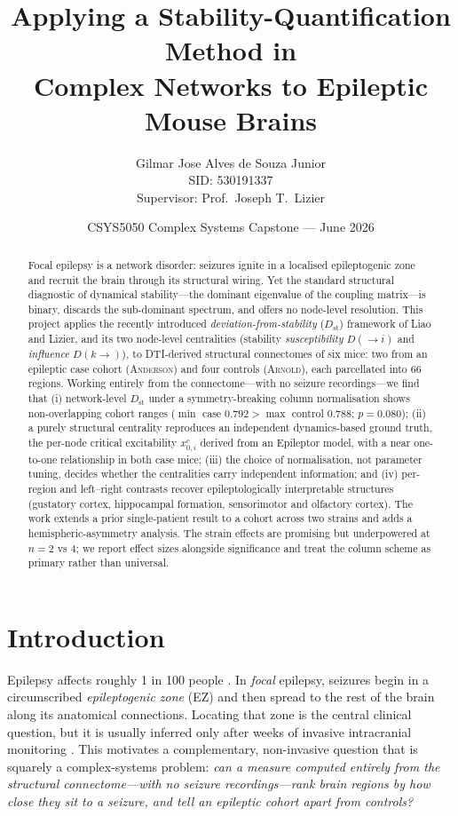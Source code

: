 \documentclass[11pt,a4paper]{article}
\title{\vspace{-1.5em}\textbf{Applying a Stability-Quantification Method in\\
Complex Networks to Epileptic Mouse Brains}}
\author{Gilmar Jose Alves de Souza Junior\\[2pt]
\small SID: 530191337\\[2pt]
\small Supervisor: Prof.\ Joseph T.\ Lizier}
\affil{\small School of Computer Science \& Centre for Complex Systems, The University of Sydney}
\date{\small CSYS5050 Complex Systems Capstone --- June 2026}
\newcommand{\Dst}{D_{\mathrm{st}}}
\newcommand{\Dto}{D(\!\to\! i)}
\newcommand{\Dfrom}{D(k\!\to\!)}
\newcommand{\xcrit}{x_{0,i}^{c}}
\begin{document}
\maketitle

\begin{abstract}
\noindent
Focal epilepsy is a network disorder: seizures ignite in a localised epileptogenic zone and
recruit the brain through its structural wiring. Yet the standard structural diagnostic of dynamical
stability---the dominant eigenvalue of the coupling matrix---is binary, discards the sub-dominant
spectrum, and offers no node-level resolution. This project applies the recently introduced
\emph{deviation-from-stability} ($\Dst$) framework of Liao and Lizier, and its two node-level
centralities (stability \emph{susceptibility} $\Dto$ and \emph{influence} $\Dfrom$), to
DTI-derived structural connectomes of six mice: two from an epileptic case cohort (\textsc{Anderson})
and four controls (\textsc{Arnold}), each parcellated into 66 regions. Working entirely from the
connectome---with no seizure recordings---we find that (i) network-level $\Dst$ under a
symmetry-breaking column normalisation shows non-overlapping cohort ranges
($\min$ case $0.792 > \max$ control $0.788$; $p=0.080$); (ii) a purely structural centrality reproduces an
independent dynamics-based ground truth, the per-node critical excitability $\xcrit$ derived from an
Epileptor model, with a near one-to-one relationship in both case mice; (iii) the choice of
normalisation, not parameter tuning, decides whether the centralities carry independent information;
and (iv) per-region and left--right contrasts recover epileptologically interpretable structures
(gustatory cortex, hippocampal formation, sensorimotor and olfactory cortex). The work extends a
prior single-patient result to a cohort across two strains and adds a hemispheric-asymmetry analysis.
The strain effects are promising but underpowered at $n=2$ vs $4$; we report effect sizes alongside
significance and treat the column scheme as primary rather than universal.
\end{abstract}

\tableofcontents
\vspace{1em}

\section{Introduction}
Epilepsy affects roughly 1 in 100 people \citep{fiest2017}. In \emph{focal} epilepsy, seizures begin
in a circumscribed \emph{epileptogenic zone} (EZ) and then spread to the rest of the brain along its
anatomical connections. Locating that zone is the central clinical question, but it is usually
inferred only after weeks of invasive intracranial monitoring \citep{rosenow2001}. This motivates a complementary,
non-invasive question that is squarely a complex-systems problem: \emph{can a measure computed
entirely from the structural connectome---with no seizure recordings---rank brain regions by how
close they sit to a seizure, and tell an epileptic cohort apart from controls?}
\end{document}
